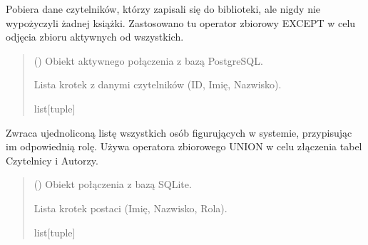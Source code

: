 \documentclass[letterpaper,10pt,english]{sphinxmanual}
\begin{document}

\begin{fulllineitems}
\label{\detokenize{rozdzial_5/index:biblioteka_zapytania.get_czytelnicy_bez_wypozyczen}}
\pysigstartsignatures
\pysiglinewithargsret
{}
{}
{}
\pysigstopsignatures
\sphinxAtStartPar
Pobiera dane czytelników, którzy zapisali się do biblioteki, ale nigdy nie wypożyczyli żadnej książki.
Zastosowano tu operator zbiorowy EXCEPT w celu odjęcia zbioru aktywnych od wszystkich.
\begin{quote}\begin{description}
\sphinxAtStartPar
{} () \textendash{} Obiekt aktywnego połączenia z bazą PostgreSQL.

\sphinxAtStartPar
Lista krotek z danymi czytelników (ID, Imię, Nazwisko).

\sphinxAtStartPar
list{[}tuple{]}

\end{description}\end{quote}

\end{fulllineitems}


\begin{fulllineitems}
\label{\detokenize{rozdzial_5/index:biblioteka_zapytania.get_katalog_osob}}
\pysigstartsignatures
\pysiglinewithargsret
{}
{}
{}
\pysigstopsignatures
\sphinxAtStartPar
Zwraca ujednoliconą listę wszystkich osób figurujących w systemie, przypisując im odpowiednią
rolę. Używa operatora zbiorowego UNION w celu złączenia tabel Czytelnicy i Autorzy.
\begin{quote}\begin{description}
\sphinxAtStartPar
{} () \textendash{} Obiekt połączenia z bazą SQLite.

\sphinxAtStartPar
Lista krotek postaci (Imię, Nazwisko, Rola).

\sphinxAtStartPar
list{[}tuple{]}

\end{description}\end{quote}

\end{fulllineitems}
\end{document}
